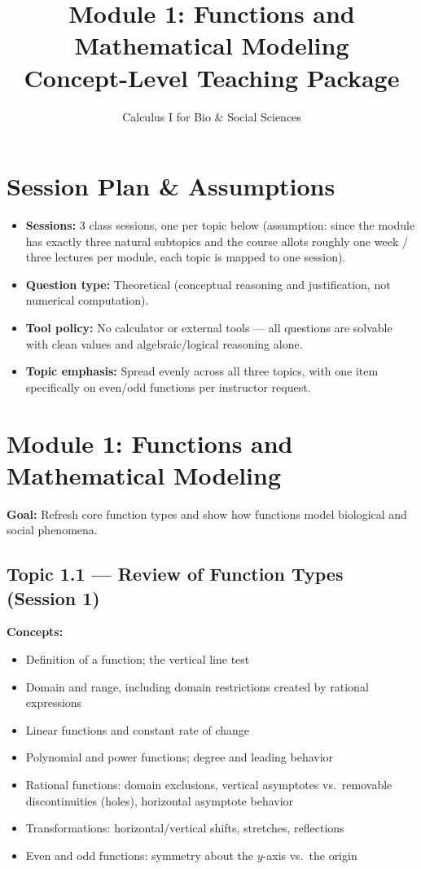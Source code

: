 \documentclass{article}
\title{Module 1: Functions and Mathematical Modeling \\ \large Concept-Level Teaching Package}
\author{Calculus I for Bio \& Social Sciences}
\date{}
\begin{document}
\maketitle
\tableofcontents

\section*{Session Plan \& Assumptions}
\begin{itemize}[leftmargin=*]
  \item \textbf{Sessions:} 3 class sessions, one per topic below (assumption: since the module has exactly three natural subtopics and the course allots roughly one week / three lectures per module, each topic is mapped to one session).
  \item \textbf{Question type:} Theoretical (conceptual reasoning and justification, not numerical computation).
  \item \textbf{Tool policy:} No calculator or external tools --- all questions are solvable with clean values and algebraic/logical reasoning alone.
  \item \textbf{Topic emphasis:} Spread evenly across all three topics, with one item specifically on even/odd functions per instructor request.
\end{itemize}

\section{Module 1: Functions and Mathematical Modeling}
\textbf{Goal:} Refresh core function types and show how functions model biological and social phenomena.

\subsection{Topic 1.1 --- Review of Function Types (Session 1)}

\textbf{Concepts:}
\begin{itemize}[leftmargin=*]
  \item Definition of a function; the vertical line test
  \item Domain and range, including domain restrictions created by rational expressions
  \item Linear functions and constant rate of change
  \item Polynomial and power functions; degree and leading behavior
  \item Rational functions: domain exclusions, vertical asymptotes vs.\ removable discontinuities (holes), horizontal asymptote behavior
  \item Transformations: horizontal/vertical shifts, stretches, reflections
  \item Even and odd functions: symmetry about the $y$-axis vs.\ the origin
\end{itemize}
\end{document}
